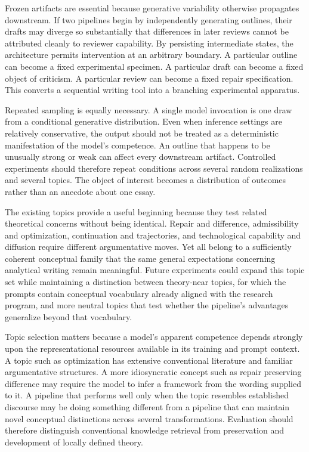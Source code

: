 \documentclass[11pt]{article}
\begin{document}
Frozen artifacts are essential because generative variability otherwise propagates downstream. If two pipelines begin by independently generating outlines, their drafts may diverge so substantially that differences in later reviews cannot be attributed cleanly to reviewer capability. By persisting intermediate states, the architecture permits intervention at an arbitrary boundary. A particular outline can become a fixed experimental specimen. A particular draft can become a fixed object of criticism. A particular review can become a fixed repair specification. This converts a sequential writing tool into a branching experimental apparatus.

Repeated sampling is equally necessary. A single model invocation is one draw from a conditional generative distribution. Even when inference settings are relatively conservative, the output should not be treated as a deterministic manifestation of the model's competence. An outline that happens to be unusually strong or weak can affect every downstream artifact. Controlled experiments should therefore repeat conditions across several random realizations and several topics. The object of interest becomes a distribution of outcomes rather than an anecdote about one essay.

The existing topics provide a useful beginning because they test related theoretical concerns without being identical. Repair and difference, admissibility and optimization, continuation and trajectories, and technological capability and diffusion require different argumentative moves. Yet all belong to a sufficiently coherent conceptual family that the same general expectations concerning analytical writing remain meaningful. Future experiments could expand this topic set while maintaining a distinction between theory-near topics, for which the prompts contain conceptual vocabulary already aligned with the research program, and more neutral topics that test whether the pipeline's advantages generalize beyond that vocabulary.

Topic selection matters because a model's apparent competence depends strongly upon the representational resources available in its training and prompt context. A topic such as optimization has extensive conventional literature and familiar argumentative structures. A more idiosyncratic concept such as repair preserving difference may require the model to infer a framework from the wording supplied to it. A pipeline that performs well only when the topic resembles established discourse may be doing something different from a pipeline that can maintain novel conceptual distinctions across several transformations. Evaluation should therefore distinguish conventional knowledge retrieval from preservation and development of locally defined theory.
\end{document}
